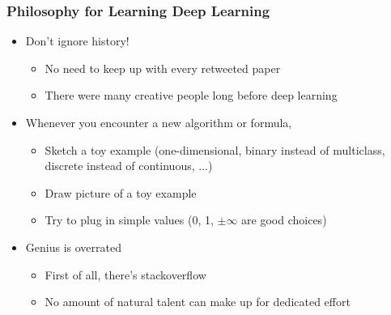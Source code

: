 \documentclass[10pt,mathserif]{beamer}
\begin{document}
\begin{frame}
  \frametitle{Philosophy for Learning Deep Learning}
  \begin{itemize}
  \item Don't ignore history!
    \begin{itemize}
    \item No need to keep up with every retweeted paper
    \item There were many creative people long before deep learning
    \end{itemize}
  \item Whenever you encounter a new algorithm or formula,
    \begin{itemize}
    \item Sketch a toy example (one-dimensional, binary instead of multiclass,
      discrete instead of continuous, ...)
    \item Draw picture of a toy example
    \item Try to plug in simple values (0, 1, $\pm \infty$ are good choices)
    \end{itemize}
  \item Genius is overrated
    \begin{itemize}
    \item First of all, there's stackoverflow
    \item No amount of natural talent can make up for dedicated effort
    \end{itemize}
  \end{itemize}
\end{frame}

\begin{frame}


\end{frame}
\end{document}
